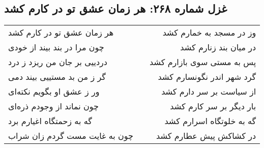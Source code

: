 \begin{center}
\section*{غزل شماره ۲۶۸: هر زمان عشق تو در کارم کشد}
\label{sec:268}
\begin{longtable}{l p{0.5cm} r}
هر زمان عشق تو در کارم کشد
&&
وز در مسجد به خمارم کشد
\\
چون مرا در بند بیند از خودی
&&
در میان بند زنارم کشد
\\
دردییی بر جان من ریزد ز درد
&&
پس به مستی سوی بازارم کشد
\\
گر ز من بد مستییی بیند دمی
&&
گرد شهر اندر نگونسارم کشد
\\
ور ز عشق او بگویم نکته‌ای
&&
از سیاست بر سر دارم کشد
\\
چون نماند از وجودم ذره‌ای
&&
بار دیگر بر سر کارم کشد
\\
گه به زحمتگاه اغیارم برد
&&
گه به خلوتگاه اسرارم کشد
\\
چون به غایت مست گردم زان شراب
&&
در کشاکش پیش عطارم کشد
\\
\end{longtable}
\end{center}
